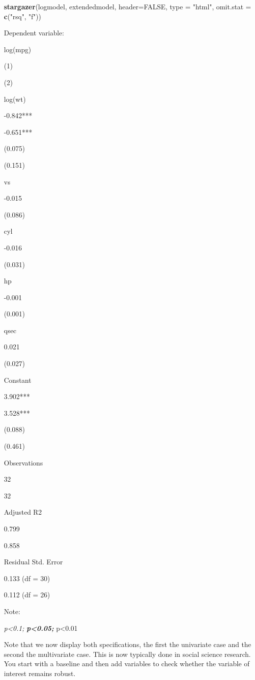 \documentclass[]{article}
\newenvironment{Shaded}{\begin{snugshade}}{\end{snugshade}}
\newcommand{\KeywordTok}[1]{\textcolor[rgb]{0.13,0.29,0.53}{\textbf{#1}}}
\newcommand{\DataTypeTok}[1]{\textcolor[rgb]{0.13,0.29,0.53}{#1}}
\newcommand{\StringTok}[1]{\textcolor[rgb]{0.31,0.60,0.02}{#1}}
\newcommand{\OtherTok}[1]{\textcolor[rgb]{0.56,0.35,0.01}{#1}}
\newcommand{\NormalTok}[1]{#1}
\theoremstyle{definition}
\theoremstyle{definition}
\theoremstyle{definition}
\theoremstyle{remark}
\begin{document}
\begin{Shaded}
\begin{Highlighting}[]
\KeywordTok{stargazer}\NormalTok{(logmodel, extendedmodel, }\DataTypeTok{header=}\OtherTok{FALSE}\NormalTok{, }\DataTypeTok{type =} \StringTok{"html"}\NormalTok{, }\DataTypeTok{omit.stat =} \KeywordTok{c}\NormalTok{(}\StringTok{"rsq"}\NormalTok{, }\StringTok{"f"}\NormalTok{))}
\end{Highlighting}
\end{Shaded}

Dependent variable:

log(mpg)

(1)

(2)

log(wt)

-0.842***

-0.651***

(0.075)

(0.151)

vs

-0.015

(0.086)

cyl

-0.016

(0.031)

hp

-0.001

(0.001)

qsec

0.021

(0.027)

Constant

3.902***

3.528***

(0.088)

(0.461)

Observations

32

32

Adjusted R2

0.799

0.858

Residual Std. Error

0.133 (df = 30)

0.112 (df = 26)

Note:

\emph{p\textless{}0.1; \textbf{p\textless{}0.05; }}p\textless{}0.01

Note that we now display both specifications, the first the univariate
case and the second the multivariate case. This is now typically done in
social science research. You start with a baseline and then add
variables to check whether the variable of interest remains robust.
\end{document}
